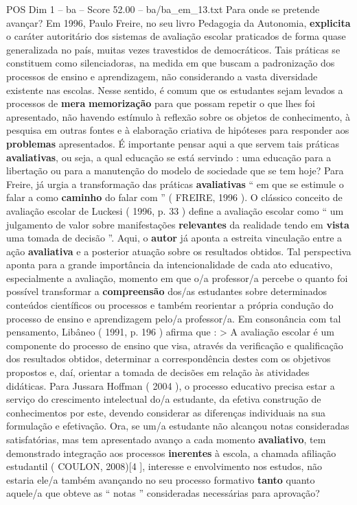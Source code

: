 \begin{textsample}{POS Dim 1 – ba – Score 52.00 – ba/ba\_em\_13.txt}
Para onde se pretende avançar?
Em 1996, Paulo Freire, no seu livro Pedagogia da Autonomia, \textbf{explicita} o caráter autoritário dos sistemas de avaliação escolar praticados de forma quase generalizada no país, muitas vezes travestidos de democráticos.
Tais práticas se constituem como silenciadoras, na medida em que buscam a padronização dos processos de ensino e aprendizagem, não considerando a vasta diversidade existente nas escolas.
Nesse sentido, é comum que os estudantes sejam levados a processos de \textbf{mera} \textbf{memorização} para que possam repetir o que lhes foi apresentado, não havendo estímulo à reflexão sobre os objetos de conhecimento, à pesquisa em outras fontes e à elaboração criativa de hipóteses para responder aos \textbf{problemas} apresentados.
É importante pensar aqui a que servem tais práticas \textbf{avaliativas}, ou seja, a qual educação se está servindo : uma educação para a libertação ou para a manutenção do modelo de sociedade que se tem hoje?
Para Freire, já urgia a transformação das práticas \textbf{avaliativas} “ em que se estimule o falar a como \textbf{caminho} do falar com ” ( FREIRE, 1996 ).
O clássico conceito de avaliação escolar de Luckesi ( 1996, p. 33 ) define a avaliação escolar como “ um julgamento de valor sobre manifestações \textbf{relevantes} da realidade tendo em \textbf{vista} uma tomada de decisão ”.
Aqui, o \textbf{autor} já aponta a estreita vinculação entre a ação \textbf{avaliativa} e a posterior atuação sobre os resultados obtidos.
Tal perspectiva aponta para a grande importância da intencionalidade de cada ato educativo, especialmente a avaliação, momento em que o/a professor/a percebe o quanto foi possível transformar a \textbf{compreensão} dos/as estudantes sobre determinados conteúdos científicos ou processos e também reorientar a própria condução do processo de ensino e aprendizagem pelo/a professor/a.
Em consonância com tal pensamento, Libâneo ( 1991, p. 196 ) afirma que : > A avaliação escolar é um componente do processo de ensino que visa, através da verificação e qualificação dos resultados obtidos, determinar a correspondência destes com os objetivos propostos e, daí, orientar a tomada de decisões em relação às atividades didáticas.
Para Jussara Hoffman ( 2004 ), o processo educativo precisa estar a serviço do crescimento intelectual do/a estudante, da efetiva construção de conhecimentos por este, devendo considerar as diferenças individuais na sua formulação e efetivação.
Ora, se um/a estudante não alcançou notas consideradas satisfatórias, mas tem apresentado avanço a cada momento \textbf{avaliativo}, tem demonstrado integração aos processos \textbf{inerentes} à escola, a chamada afiliação estudantil ( COULON, 2008)[4 ], interesse e envolvimento nos estudos, não estaria ele/a também avançando no seu processo formativo \textbf{tanto} quanto aquele/a que obteve as “ notas ” consideradas necessárias para aprovação?

\end{textsample}
